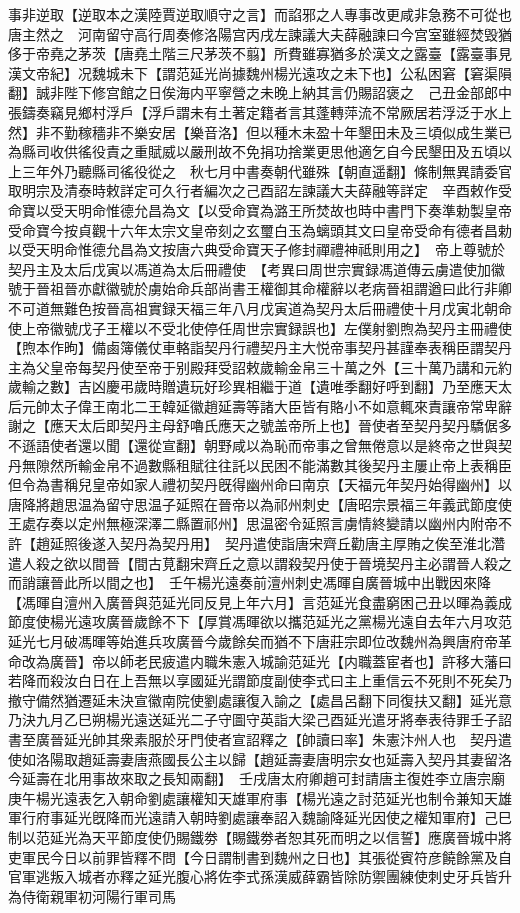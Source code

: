 事非逆取【逆取本之漢陸賈逆取順守之言】而諂邪之人專事改更咸非急務不可從也唐主然之　河南留守高行周奏修洛陽宫丙戌左諫議大夫薛融諫曰今宫室雖經焚毁猶侈于帝堯之茅茨【唐堯土階三尺茅茨不翦】所費雖寡猶多於漢文之露臺【露臺事見漢文帝紀】况魏城未下【謂范延光尚據魏州楊光遠攻之未下也】公私困窘【窘渠隕翻】誠非陛下修宫館之日俟海内平寧營之未晚上納其言仍賜詔褒之　己丑金部郎中張鑄奏竊見鄉村浮戶【浮戶謂未有土著定籍者言其蓬轉萍流不常厥居若浮泛于水上然】非不勤稼穡非不樂安居【樂音洛】但以種木未盈十年墾田未及三頃似成生業已為縣司收供徭役責之重賦威以嚴刑故不免捐功捨業更思他適乞自今民墾田及五頃以上三年外乃聽縣司徭役從之　秋七月中書奏朝代雖殊【朝直遥翻】條制無異請委官取明宗及清泰時敕詳定可久行者編次之己酉詔左諫議大夫薛融等詳定　辛酉敕作受命寶以受天明命惟德允昌為文【以受命寶為潞王所焚故也時中書門下奏準勅製皇帝受命寶今按貞觀十六年太宗文皇帝刻之玄璽白玉為螭頭其文曰皇帝受命有德者昌勅以受天明命惟德允昌為文按唐六典受命寶天子修封禪禮神祗則用之】　帝上尊號於契丹主及太后戊寅以馮道為太后冊禮使　【考異曰周世宗實録馮道傳云虜遣使加徽號于晉祖晉亦獻徽號於虜始命兵部尚書王權御其命權辭以老病晉祖謂遒曰此行非卿不可道無難色按晉高祖實録天福三年八月戊寅道為契丹太后冊禮使十月戊寅北朝命使上帝徽號戊子王權以不受北使停任周世宗實録誤也】左僕射劉煦為契丹主冊禮使【煦本作昫】備鹵簿儀仗車輅詣契丹行禮契丹主大悦帝事契丹甚謹奉表稱臣謂契丹主為父皇帝每契丹使至帝于别殿拜受詔敕歲輸金帛三十萬之外【三十萬乃講和元約歲輸之數】吉凶慶弔歲時贈遺玩好珍異相繼于道【遺唯季翻好呼到翻】乃至應天太后元帥太子偉王南北二王韓延徽趙延壽等諸大臣皆有賂小不如意輒來責讓帝常卑辭謝之【應天太后即契丹主母舒嚕氏應天之號盖帝所上也】晉使者至契丹契丹驕倨多不遜語使者還以聞【還從宣翻】朝野咸以為恥而帝事之曾無倦意以是終帝之世與契丹無隙然所輸金帛不過數縣租賦往往託以民困不能滿數其後契丹主屢止帝上表稱臣但令為書稱兒皇帝如家人禮初契丹旣得幽州命曰南京【天福元年契丹始得幽州】以唐降將趙思温為留守思温子延照在晉帝以為祁州刺史【唐昭宗景福三年義武節度使王處存奏以定州無極深澤二縣置祁州】思温密令延照言虜情終變請以幽州内附帝不許【趙延照後遂入契丹為契丹用】　契丹遣使詣唐宋齊丘勸唐主厚賄之俟至淮北濳遣人殺之欲以間晉【間古莧翻宋齊丘之意以謂殺契丹使于晉境契丹主必謂晉人殺之而誚讓晉此所以間之也】　壬午楊光遠奏前澶州刺史馮暉自廣晉城中出戰因來降【馮暉自澶州入廣晉與范延光同反見上年六月】言范延光食盡窮困己丑以暉為義成節度使楊光遠攻廣晉歲餘不下【厚賞馮暉欲以攜范延光之黨楊光遠自去年六月攻范延光七月破馮暉等始進兵攻廣晉今歲餘矣而猶不下唐莊宗即位改魏州為興唐府帝革命改為廣晉】帝以師老民疲遣内職朱憲入城諭范延光【内職蓋宦者也】許移大藩曰若降而殺汝白日在上吾無以享國延光謂節度副使李式曰主上重信云不死則不死矣乃撤守備然猶遷延未決宣徽南院使劉處讓復入諭之【處昌呂翻下同復扶又翻】延光意乃決九月乙巳朔楊光遠送延光二子守圖守英詣大梁己酉延光遣牙將奉表待罪壬子詔書至廣晉延光帥其衆素服於牙門使者宣詔釋之【帥讀曰率】朱憲汴州人也　契丹遣使如洛陽取趙延壽妻唐燕國長公主以歸【趙延壽妻唐明宗女也延壽入契丹其妻留洛今延壽在北用事故來取之長知兩翻】　壬戌唐太府卿趙可封請唐主復姓李立唐宗廟　庚午楊光遠表乞入朝命劉處讓權知天雄軍府事【楊光遠之討范延光也制令兼知天雄軍行府事延光旣降而光遠請入朝時劉處讓奉詔入魏諭降延光因使之權知軍府】己巳制以范延光為天平節度使仍賜鐵劵【賜鐵劵者恕其死而明之以信誓】應廣晉城中將吏軍民今日以前罪皆釋不問【今日謂制書到魏州之日也】其張從賓符彦饒餘黨及自官軍逃叛入城者亦釋之延光腹心將佐李式孫漢威薛霸皆除防禦團練使刺史牙兵皆升為侍衛親軍初河陽行軍司馬